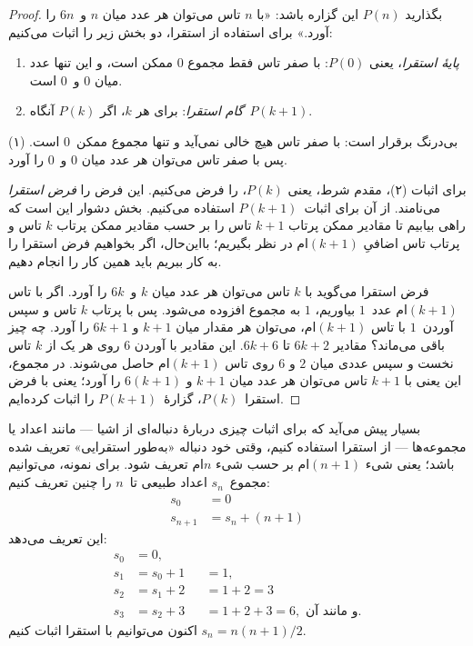 \documentclass[../../../include/open-logic-section]{subfiles}
\begin{document}
\begin{proof}
بگذارید $P(n)$ این گزاره باشد: «با $n$ تاس می‌توان هر عدد میان $n$
و~$6n$ را آورد.» برای استفاده از استقرا، دو بخش زیر را اثبات می‌کنیم:
\begin{enumerate}
\item \emph{پایهٔ استقرا}، یعنی $P(0)$: با صفر تاس فقط مجموع $0$ ممکن
  است، و این تنها عدد میان $0$ و~$0$ است.
\item \emph{گام استقرا}: برای هر $k$، اگر $P(k)$ آنگاه~$P(k+1)$.
\end{enumerate}

(۱) بی‌درنگ برقرار است: با صفر تاس هیچ خالی نمی‌آید و تنها مجموع
ممکن~$0$ است. پس با صفر تاس می‌توان هر عدد میان $0$ و~$0$ را آورد.

برای اثبات (۲)، مقدم شرط، یعنی $P(k)$، را فرض می‌کنیم. این فرض را
\emph{فرض استقرا} می‌نامند. از آن برای اثبات~$P(k+1)$ استفاده می‌کنیم.
بخش دشوار این است که راهی بیابیم تا مقادیر ممکن پرتاب $k+1$ تاس را
بر حسب مقادیر ممکن پرتاب $k$ تاس و پرتاب تاس اضافیِ $(k+1)$ام در نظر
بگیریم؛ بااین‌حال، اگر بخواهیم فرض استقرا را به کار ببریم باید همین
کار را انجام دهیم.

فرض استقرا می‌گوید با $k$ تاس می‌توان هر عدد میان $k$ و~$6k$ را آورد.
اگر با تاس $(k+1)$ام عدد~$1$ بیاوریم، $1$ به مجموع افزوده می‌شود. پس
با پرتاب $k$ تاس و سپس آوردن~$1$ با تاس $(k+1)$ام، می‌توان هر مقدار
میان $k+1$ و $6k+1$ را آورد. چه چیز باقی می‌ماند؟ مقادیر $6k+2$ تا
$6k+6$. این مقادیر با آوردن $6$ روی هر یک از $k$ تاس نخست و سپس عددی
میان $2$ و $6$ روی تاس $(k+1)$ام حاصل می‌شوند. در مجموع، این یعنی با
$k+1$ تاس می‌توان هر عدد میان $k+1$ و $6(k+1)$ را آورد؛ یعنی با فرض
استقرا~$P(k)$، گزارهٔ~$P(k+1)$ را اثبات کرده‌ایم.
\end{proof}

بسیار پیش می‌آید که برای اثبات چیزی دربارهٔ دنباله‌ای از اشیا — مانند
اعداد یا مجموعه‌ها — از استقرا استفاده کنیم، وقتی خود دنباله «به‌طور
استقرایی» تعریف شده باشد؛ یعنی شیء $(n+1)$ام بر حسب شیء $n$ام تعریف
شود. برای نمونه، می‌توانیم مجموع~$s_n$ اعداد طبیعی تا~$n$ را چنین
تعریف کنیم:
\begin{align*}
  s_0 & = 0\\
  s_{n+1} & = s_n + (n+1)
\end{align*}
این تعریف می‌دهد:
\begin{align*}
  s_0 & = 0,\\
  s_1 & = s_0 + 1 && = 1,\\
  s_2 & = s_1 + 2 && = 1 + 2 = 3\\
  s_3 & = s_2 + 3 && = 1 + 2 + 3 = 6, \text{ و مانند آن.}
\end{align*}
اکنون می‌توانیم با استقرا اثبات کنیم $s_n = n(n+1)/2$.
\end{document}
